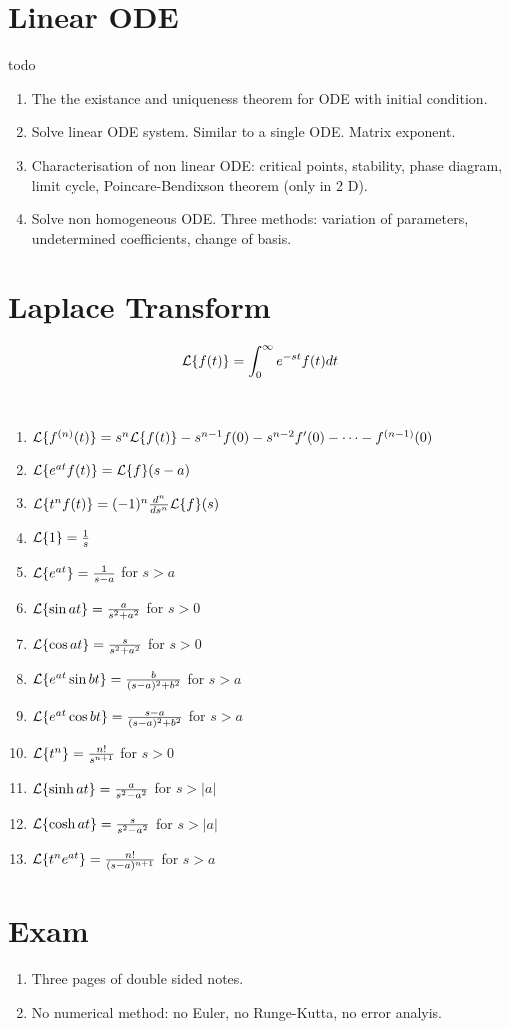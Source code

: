 \documentclass[12pt]{article}
\begin{document}
\section{Linear ODE}
\begin{definition}[ODE]
	todo
\end{definition}

\begin{enumerate}
	\item The the existance and uniqueness theorem for ODE with initial condition.
	\item Solve linear ODE system. Similar to a single ODE. Matrix exponent.
	\item Characterisation of non linear ODE: critical points, stability, phase diagram, limit cycle, Poincare-Bendixson theorem (only in 2 D).
	\item Solve non homogeneous ODE. Three methods: variation of parameters, undetermined coefficients, change of basis.
\end{enumerate}


\section{Laplace Transform}

\begin{definition}
	\begin{equation}
		\mathcal{L}\{f(t)\} = \int_{0}^{\infty} e^{-st} f(t) dt
	\end{equation}
\end{definition}

\begin{theorem}
	\ 
\begin{enumerate}
	\item $\mathcal{L}\{f^{(n)}(t)\} = s^n \mathcal{L}\{f(t)\} - s^{n-1}f(0) - s^{n-2}f'(0) - \cdots - f^{(n-1)}(0)$
	\item $\mathcal{L}\{e^{at}f(t)\} = \mathcal{L}\{f\}(s-a)$
	\item $\mathcal{L}\{t^nf(t)\} = (-1)^n \frac{d^n}{ds^n} \mathcal{L}\{f\}(s)$
	\item $\mathcal{L}\{1\} = \frac{1}{s}$
	\item $\mathcal{L}\{e^{at}\} = \frac{1}{s-a}$ for $s>a$
	\item $\mathcal{L}\{\sin{at}\} = \frac{a}{s^2+a^2}$ for $s>0$
	\item $\mathcal{L}\{\cos{at}\} = \frac{s}{s^2+a^2}$ for $s>0$
	\item $\mathcal{L}\{e^{at}\sin{bt}\} = \frac{b}{(s-a)^2+b^2}$ for $s>a$
	\item $\mathcal{L}\{e^{at}\cos{bt}\} = \frac{s-a}{(s-a)^2+b^2}$ for $s>a$
	\item $\mathcal{L}\{t^n\} = \frac{n!}{s^{n+1}}$ for $s>0$
	\item $\mathcal{L}\{\sinh{at}\} = \frac{a}{s^2-a^2}$ for $s>|a|$
	\item $\mathcal{L}\{\cosh{at}\} = \frac{s}{s^2-a^2}$ for $s>|a|$
	\item $\mathcal{L}\{t^n e^{at}\} = \frac{n!}{(s-a)^{n+1}}$ for $s>a$
\end{enumerate}	
\end{theorem}


\section{Exam}
\begin{enumerate}
	\item Three pages of double sided notes.
	\item No numerical method: no Euler, no Runge-Kutta, no error analyis.
\end{enumerate}
\end{document}
